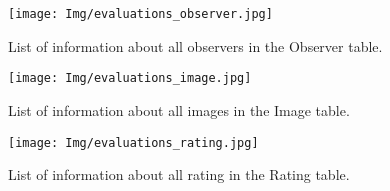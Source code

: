 \begin{figure}[H]
	\centering
	\texttt{[image: Img/evaluations\_observer.jpg]}
	\caption{List of information about all observers in the Observer table.}
	\label{fig:observer_table}
\end{figure}

\begin{figure}[H]
	\centering
	\texttt{[image: Img/evaluations\_image.jpg]}
	\caption{List of information about all images in the Image table.}
	\label{fig:image_table}
\end{figure}

\begin{figure}[H]
	\centering
	\texttt{[image: Img/evaluations\_rating.jpg]}
	\caption{List of information about all rating in the Rating table.}
	\label{fig:rating_table}
\end{figure}